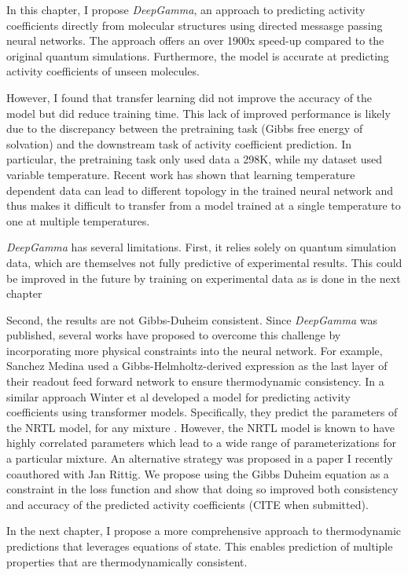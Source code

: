 In this chapter, I propose \textit{DeepGamma}, an approach to predicting activity coefficients directly from molecular structures using directed messasge passing neural networks. The approach offers an over 1900x speed-up compared to the original quantum simulations.  Furthermore, the model is accurate at predicting activity coefficients of unseen molecules.

However, I found that transfer learning did not improve the accuracy of the model but did reduce training time. This lack of improved performance is likely due to the discrepancy between the pretraining task (Gibbs free energy of solvation) and the downstream task of activity coefficient prediction. In particular, the pretraining task only used data a 298K, while my dataset used variable temperature. Recent work \cite{Lansford2023} has shown that learning temperature dependent data can lead to different topology in the trained neural network and thus makes it difficult to transfer from a model trained at a single temperature to one at multiple temperatures.

\textit{DeepGamma} has several limitations. First,  it relies solely on quantum simulation data, which are themselves not fully predictive of experimental results. This could be improved in the future by training on experimental data as is done in the next chapter

Second, the results are not Gibbs-Duheim  consistent. Since \textit{DeepGamma} was published, several works have proposed to overcome this challenge by incorporating more physical constraints into the neural network. For example, Sanchez Medina used  a Gibbs-Helmholtz-derived expression as the last layer of their readout feed forward network to ensure thermodynamic consistency.\cite{SanchezMedina2023} In a similar approach Winter et al developed a model for predicting activity coefficients using transformer models. Specifically, they predict the parameters of the NRTL model, for any mixture \cite{Winter2022}.  However, the NRTL model is known to have highly correlated parameters which lead to a wide range of parameterizations for a particular mixture. An alternative strategy was proposed in a paper I recently coauthored with Jan Rittig. We propose using the Gibbs Duheim equation as a constraint in the loss function and show that doing so improved both consistency and accuracy of the predicted activity coefficients (CITE when submitted). 

In the next chapter, I propose a more comprehensive approach to thermodynamic predictions that leverages equations of state. This enables prediction of multiple properties that are thermodynamically consistent.


